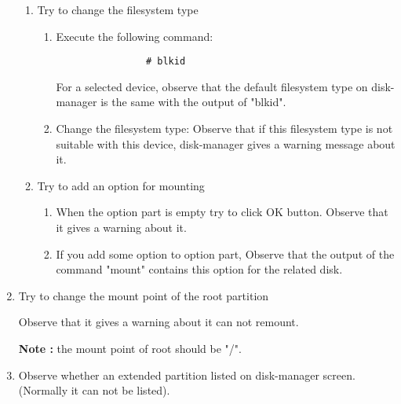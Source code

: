 \documentclass[a4paper,10pt]{article}
\begin{document}
\begin{enumerate}
\begin{enumerate}
    \item Try to change the filesystem type
        \begin{enumerate}
            \item Execute the following command:
            \begin{verbatim}
                # blkid
            \end{verbatim}
                  For a selected device, observe that the default filesystem type on disk-manager is the same with the output of "blkid".
            \item Change the filesystem type:
                  Observe that if this filesystem type is not suitable with this device, disk-manager gives a warning message about it.
        \end{enumerate}

    \item Try to add an option for mounting
        \begin{enumerate}
          \item When the option part is empty try to click OK button.
                Observe that it gives a warning about it.
          \item If you add some option to option part,
                Observe that the output of the command "mount" contains this option for the related disk.
        \end{enumerate}
    \end{enumerate}

\item Try to change the mount point of the root partition

      Observe that it gives a warning about it can not remount.

        \textbf{Note :} the mount point of root should be "/".

\item Observe whether an extended partition listed on disk-manager screen. (Normally it can not be listed).

\end{enumerate}
\end{document}
